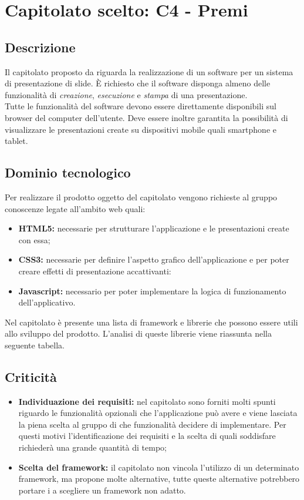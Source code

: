 \section{Capitolato scelto: C4 - Premi}

\subsection{Descrizione}
Il capitolato proposto da \proponente riguarda la realizzazione di un software per un sistema di presentazione di slide. È richiesto che il software disponga almeno delle funzionalità di \emph{creazione}, \emph{esecuzione} e \emph{stampa} di una presentazione. \\
Tutte le funzionalità del software devono essere direttamente disponibili sul browser del computer dell'utente. Deve essere inoltre garantita la possibilità di visualizzare le presentazioni create su dispositivi mobile quali smartphone e tablet.

\subsection{Dominio tecnologico}

Per realizzare il prodotto oggetto del capitolato vengono richieste al gruppo conoscenze legate all'ambito web quali:
\begin{itemize}
\item \textbf{HTML5:} necessarie per strutturare l'applicazione e le presentazioni create con essa;
\item \textbf{CSS3:} necessarie per definire l'aspetto grafico dell'applicazione e per poter creare effetti di presentazione accattivanti:
\item \textbf{Javascript:} necessario per poter implementare la logica di funzionamento dell'applicativo.
\end{itemize}

Nel capitolato è presente una lista di framework e librerie che possono essere utili allo sviluppo del prodotto. L'analisi di queste librerie viene riassunta nella seguente tabella.




\subsection{Criticità}
\begin{itemize}
\item \textbf{Individuazione dei requisiti:} nel capitolato sono forniti molti spunti riguardo le funzionalità opzionali che l'applicazione può avere e viene lasciata la piena scelta al gruppo di che funzionalità decidere di implementare. Per questi motivi l'identificazione dei requisiti e la scelta di quali soddisfare richiederà una grande quantità di tempo;
\item \textbf{Scelta del framework:} il capitolato non vincola l'utilizzo di un determinato framework, ma propone molte alternative, tutte queste alternative potrebbero portare i \rPs a scegliere un framework non adatto.
\end{itemize}


